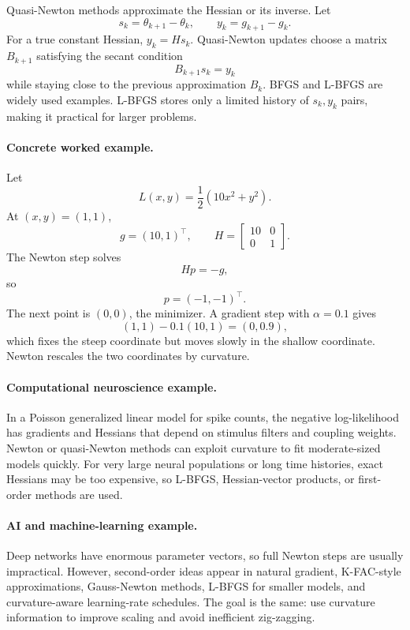 Quasi-Newton methods approximate the Hessian or its inverse. Let
\[
s_k=\theta_{k+1}-\theta_k,\qquad
y_k=g_{k+1}-g_k.
\]
For a true constant Hessian, \(y_k=Hs_k\). Quasi-Newton updates choose a matrix \(B_{k+1}\) satisfying the secant condition
\[
B_{k+1}s_k=y_k
\]
while staying close to the previous approximation \(B_k\). BFGS and L-BFGS are widely used examples. L-BFGS stores only a limited history of \(s_k,y_k\) pairs, making it practical for larger problems.

\paragraph{Concrete worked example.}
Let
\[
L(x,y)=\frac12(10x^2+y^2).
\]
At \((x,y)=(1,1)\),
\[
g=(10,1)^\top,
\qquad
H=
\begin{bmatrix}
10&0\\
0&1
\end{bmatrix}.
\]
The Newton step solves
\[
Hp=-g,
\]
so
\[
p=(-1,-1)^\top.
\]
The next point is \((0,0)\), the minimizer. A gradient step with \(\alpha=0.1\) gives
\[
(1,1)-0.1(10,1)=(0,0.9),
\]
which fixes the steep coordinate but moves slowly in the shallow coordinate. Newton rescales the two coordinates by curvature.

\paragraph{Computational neuroscience example.}
In a Poisson generalized linear model for spike counts, the negative log-likelihood has gradients and Hessians that depend on stimulus filters and coupling weights. Newton or quasi-Newton methods can exploit curvature to fit moderate-sized models quickly. For very large neural populations or long time histories, exact Hessians may be too expensive, so L-BFGS, Hessian-vector products, or first-order methods are used.

\paragraph{AI and machine-learning example.}
Deep networks have enormous parameter vectors, so full Newton steps are usually impractical. However, second-order ideas appear in natural gradient, K-FAC-style approximations, Gauss-Newton methods, L-BFGS for smaller models, and curvature-aware learning-rate schedules. The goal is the same: use curvature information to improve scaling and avoid inefficient zig-zagging.

